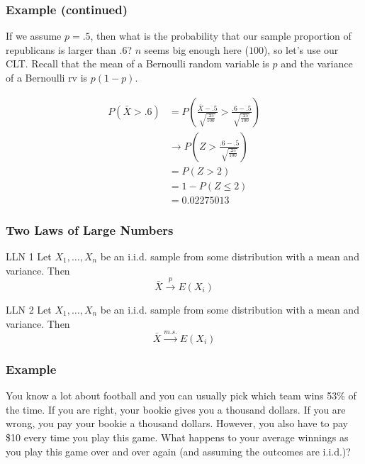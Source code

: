 \documentclass{beamer}
\begin{document}


\begin{frame}
\frametitle{Example (continued)}

If we assume $p = .5$, then what is the probability that our sample proportion of republicans is larger than .6? $n$ seems big enough here ($100$), so let's use our CLT. Recall that the mean of a Bernoulli random variable is $p$ and the variance of a Bernoulli rv is $p(1-p)$.
\newline

\begin{align*}
P(\bar{X} > .6) &= P\left(\frac{ \bar{X}-.5 }{ \sqrt{\frac{.25}{100}} } > \frac{.6 - .5}{ \sqrt{\frac{.25}{100}} } \right) \\
&\rightarrow P\left( Z > \frac{.6 - .5}{\sqrt{\frac{.25}{100}}} \right) \\
&= P(Z > 2) \\
&= 1 - P(Z \le 2) \\
&= 0.02275013
\end{align*}

\end{frame}



\begin{frame}
\frametitle{Two Laws of Large Numbers}

\begin{block}{LLN 1}
Let $X_1, \ldots, X_n$ be an i.i.d. sample from some distribution with a mean and variance. Then
\[
\bar{X} \overset{p}{\rightarrow} E(X_i)
\]
\end{block}

\begin{block}{LLN 2}
Let $X_1, \ldots, X_n$ be an i.i.d. sample from some distribution with a mean and variance. Then
\[
\bar{X} \overset{m.s.}{\rightarrow} E(X_i)
\]
\end{block}

\end{frame}




\begin{frame}
\frametitle{Example}

You know a lot about football and you can usually pick which team wins 53\% of the time. If you are right, your bookie gives you a thousand dollars. If you are wrong, you pay your bookie a thousand dollars. However, you also have to pay \$10 every time you play this game. What happens to your average winnings as you play this game over and over again (and assuming the outcomes are i.i.d.)? 

\end{frame}
\end{document}
